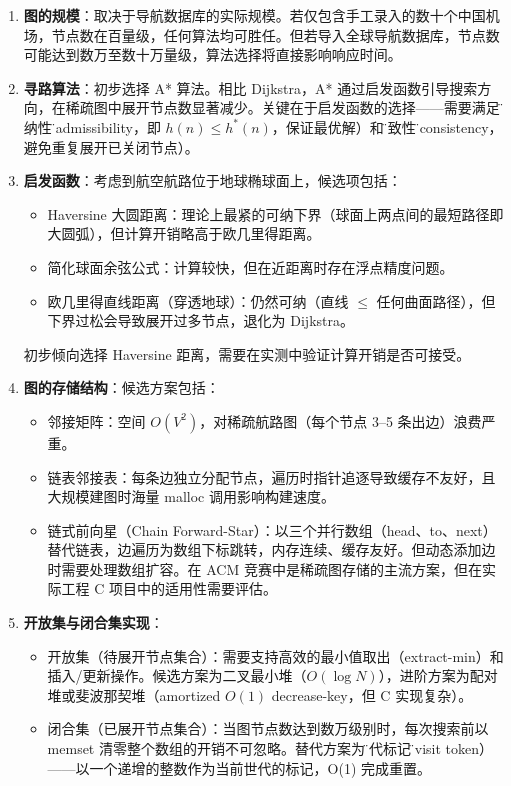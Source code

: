 \documentclass[12pt,a4paper]{ctexart}
\begin{document}
\begin{enumerate}[leftmargin=*]
    \item \textbf{图的规模}：取决于导航数据库的实际规模。若仅包含手工录入的数十个中国机场，节点数在百量级，任何算法均可胜任。但若导入全球导航数据库，节点数可能达到数万至数十万量级，算法选择将直接影响响应时间。
    \item \textbf{寻路算法}：初步选择 A* 算法。相比 Dijkstra，A* 通过启发函数引导搜索方向，在稀疏图中展开节点数显著减少。关键在于启发函数的选择——需要满足\"可纳性\"（admissibility，即 $h(n) \leq h^*(n)$，保证最优解）和\"一致性\"（consistency，避免重复展开已关闭节点）。
    \item \textbf{启发函数}：考虑到航空航路位于地球椭球面上，候选项包括：
    \begin{itemize}
        \item Haversine 大圆距离：理论上最紧的可纳下界（球面上两点间的最短路径即大圆弧），但计算开销略高于欧几里得距离。
        \item 简化球面余弦公式：计算较快，但在近距离时存在浮点精度问题。
        \item 欧几里得直线距离（穿透地球）：仍然可纳（直线 $\leq$ 任何曲面路径），但下界过松会导致展开过多节点，退化为 Dijkstra。
    \end{itemize}
    初步倾向选择 Haversine 距离，需要在实测中验证计算开销是否可接受。
    \item \textbf{图的存储结构}：候选方案包括：
    \begin{itemize}
        \item 邻接矩阵：空间 $O(V^2)$，对稀疏航路图（每个节点 3--5 条出边）浪费严重。
        \item 链表邻接表：每条边独立分配节点，遍历时指针追逐导致缓存不友好，且大规模建图时海量 malloc 调用影响构建速度。
        \item 链式前向星（Chain Forward-Star）：以三个并行数组（head、to、next）替代链表，边遍历为数组下标跳转，内存连续、缓存友好。但动态添加边时需要处理数组扩容。在 ACM 竞赛中是稀疏图存储的主流方案，但在实际工程 C 项目中的适用性需要评估。
    \end{itemize}
    \item \textbf{开放集与闭合集实现}：
    \begin{itemize}
        \item 开放集（待展开节点集合）：需要支持高效的最小值取出（extract-min）和插入/更新操作。候选方案为二叉最小堆（$O(\log N)$），进阶方案为配对堆或斐波那契堆（amortized $O(1)$ decrease-key，但 C 实现复杂）。
        \item 闭合集（已展开节点集合）：当图节点数达到数万级别时，每次搜索前以 memset 清零整个数组的开销不可忽略。替代方案为\"世代标记\"（visit token）——以一个递增的整数作为当前世代的标记，O(1) 完成重置。
    \end{itemize}
\end{enumerate}
\end{document}

